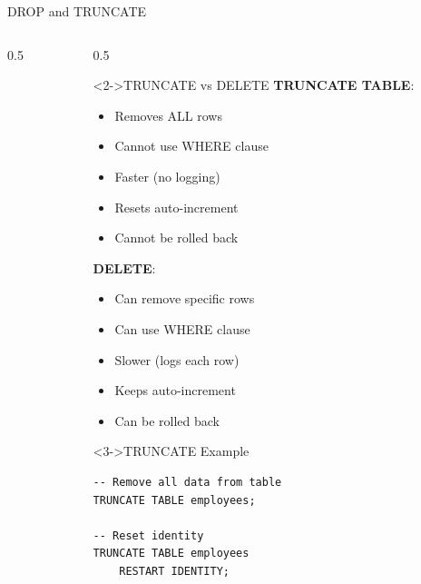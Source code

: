 \documentclass[aspectratio=169,11pt]{beamer}
\begin{document}
\begin{frame}[fragile]{DROP and TRUNCATE}
\begin{columns}[T]
\begin{column}{0.5\textwidth}
\end{column}

\pause
\begin{column}{0.5\textwidth}
\begin{alertblock}<2->{TRUNCATE vs DELETE}
\textbf{TRUNCATE TABLE}:
\begin{itemize}
    \item Removes ALL rows
    \item Cannot use WHERE clause
    \item Faster (no logging)
    \item Resets auto-increment
    \item Cannot be rolled back
\end{itemize}

\textbf{DELETE}:
\begin{itemize}
    \item Can remove specific rows
    \item Can use WHERE clause
    \item Slower (logs each row)
    \item Keeps auto-increment
    \item Can be rolled back
\end{itemize}
\end{alertblock}

\begin{exampleblock}<3->{TRUNCATE Example}
\begin{lstlisting}
-- Remove all data from table
TRUNCATE TABLE employees;

-- Reset identity
TRUNCATE TABLE employees 
    RESTART IDENTITY;
\end{lstlisting}
\end{exampleblock}
\end{column}
\end{columns}
\end{frame}
\end{document}
